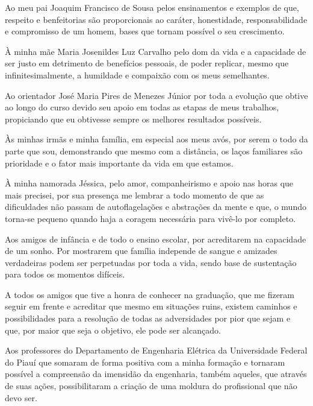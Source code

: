 Ao meu pai Joaquim Francisco de Sousa pelos ensinamentos e exemplos de que, respeito e benfeitorias são proporcionais ao caráter, honestidade, responsabilidade e compromisso de um homem, bases que tornam possível o seu crescimento.
    
À minha mãe Maria Josenildes Luz Carvalho pelo dom da vida e a capacidade de ser justo em detrimento de benefícios pessoais, de poder replicar, mesmo que infinitesimalmente, a humildade e compaixão com os meus semelhantes.
    
Ao orientador José Maria Pires de Menezes Júnior por toda a evolução que obtive ao longo do curso devido seu apoio em todas as etapas de meus trabalhos, propiciando que eu obtivesse sempre os melhores resultados possíveis.
    
Às minhas irmãs e minha família, em especial aos meus avós, por serem o todo da parte que sou, demonstrando que mesmo com a distância, os laços familiares são prioridade e o fator mais importante da vida em que estamos.
    
À minha namorada Jéssica, pelo amor, companheirismo e apoio nas horas que mais precisei, por sua presença me lembrar a todo momento de que as dificuldades não passam de autoflagelações e abstrações da mente e que, o mundo torna-se pequeno quando haja a coragem necessária para vivê-lo por completo.
    
Aos amigos de infância e de todo o ensino escolar, por acreditarem na capacidade de um sonho. Por mostrarem que família independe de sangue e amizades verdadeiras podem ser perpetuadas por toda a vida, sendo base de sustentação para todos os momentos difíceis.
    
A todos os amigos que tive a honra de conhecer na graduação, que me fizeram seguir em frente e acreditar que mesmo em situações ruins, existem caminhos e possibilidades para a resolução de todas as adversidades por pior que sejam e que, por maior que seja o objetivo, ele pode ser alcançado.
    
Aos professores do Departamento de Engenharia Elétrica da Universidade Federal do Piauí que somaram de forma positiva com a minha formação e tornaram possível a compreensão da imensidão da engenharia, também aqueles, que através de suas ações, possibilitaram a criação de uma moldura do profissional que não devo ser.